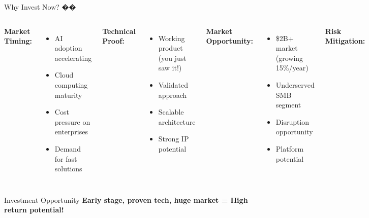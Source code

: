 \documentclass[aspectratio=169]{beamer}
\begin{document}
\begin{frame}{Why Invest Now? ��}
\begin{columns}
\textbf{Market Timing:}
\begin{itemize}
    \item AI adoption accelerating
    \item Cloud computing maturity
    \item Cost pressure on enterprises
    \item Demand for fast solutions
\end{itemize}

\vspace{0.3cm}
\textbf{Technical Proof:}
\begin{itemize}
    \item Working product (you just saw it!)
    \item Validated approach
    \item Scalable architecture
    \item Strong IP potential
\end{itemize}

\textbf{Market Opportunity:}
\begin{itemize}
    \item \$2B+ market (growing 15\%/year)
    \item Underserved SMB segment
    \item Disruption opportunity
    \item Platform potential
\end{itemize}

\vspace{0.3cm}
\textbf{Risk Mitigation:}
\begin{itemize}
    \item Proven technology
    \item Clear go-to-market
    \item Experienced team
    \item Multiple revenue streams
\end{itemize}
\end{columns}

\vspace{0.5cm}
\begin{alertblock}{Investment Opportunity}
\textbf{Early stage, proven tech, huge market = High return potential!}
\end{alertblock}
\end{frame}

\end{document}
